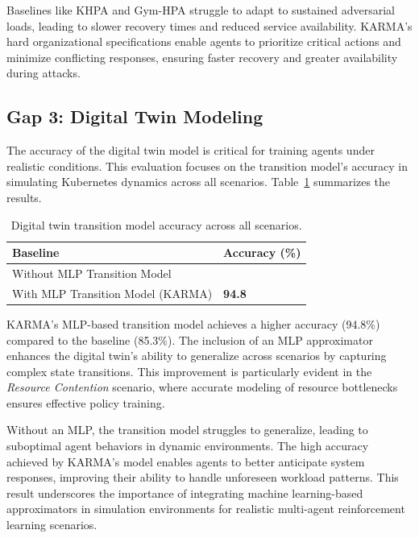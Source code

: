 \documentclass[conference]{IEEEtran}
\begin{document}
Baselines like KHPA and Gym-HPA struggle to adapt to sustained adversarial loads, leading to slower recovery times and reduced service availability.
KARMA's hard organizational specifications enable agents to prioritize critical actions and minimize conflicting responses, ensuring faster recovery and greater availability during attacks.

\subsection{Gap 3: Digital Twin Modeling}
The accuracy of the digital twin model is critical for training agents under realistic conditions. This evaluation focuses on the transition model's accuracy in simulating Kubernetes dynamics across all scenarios. Table~\ref{tab:digital_twin_accuracy} summarizes the results.

\begin{table}[h]
    \centering
    \caption{Digital twin transition model accuracy across all scenarios.}
    \label{tab:digital_twin_accuracy}
    \begin{tabular}{>{\raggedright\arraybackslash}m{6cm}>{\centering\arraybackslash}m{2cm}}
        \hline
        \textbf{Baseline} & \textbf{Accuracy (\%)} \\
        \hline
        Without MLP Transition Model & 85.3 \\
        With MLP Transition Model (KARMA) & \textbf{94.8} \\
        \hline
    \end{tabular}
\end{table}

KARMA's MLP-based transition model achieves a higher accuracy (94.8\%) compared to the baseline (85.3\%). The inclusion of an MLP approximator enhances the digital twin's ability to generalize across scenarios by capturing complex state transitions. This improvement is particularly evident in the \textit{Resource Contention} scenario, where accurate modeling of resource bottlenecks ensures effective policy training.

Without an MLP, the transition model struggles to generalize, leading to suboptimal agent behaviors in dynamic environments. The high accuracy achieved by KARMA's model enables agents to better anticipate system responses, improving their ability to handle unforeseen workload patterns. This result underscores the importance of integrating machine learning-based approximators in simulation environments for realistic multi-agent reinforcement learning scenarios.
\end{document}
